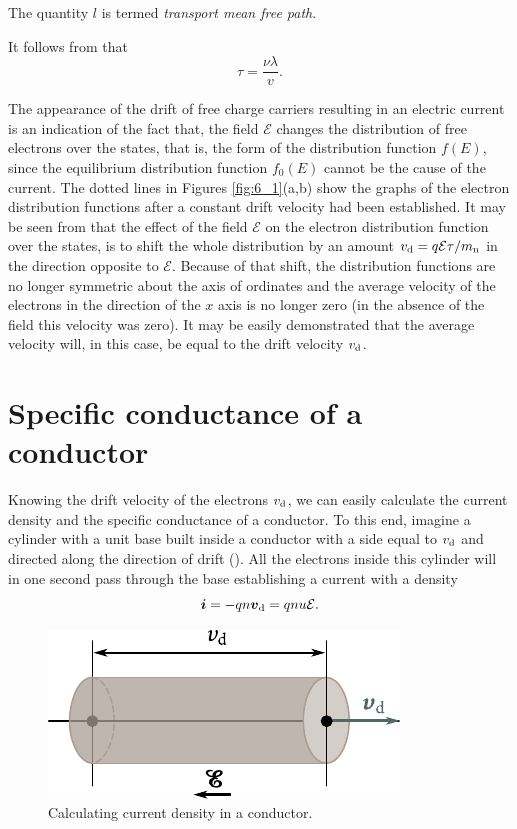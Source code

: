\noindent
The quantity $l$ is termed \textit{transport mean free path}.

It follows from  that
\begin{equation}\label{eq:6_10}
    \tau = \frac{\nu \lambda}{v}.
\end{equation}

\noindent
The appearance of the drift of free charge carriers resulting in an electric current is an indication of the fact that, the field $\mathcal{E}$ changes the distribution of free electrons over the states, that is, the form of the distribution function $f(E)$, since the equilibrium distribution function $f_0(E)$ cannot be the cause of the current. The dotted lines in Figures \ref{fig:6_1}(a,b) show the graphs of the electron distribution functions after a constant drift velocity had been established. It may be seen from  that the effect of the field $\mathcal{E}$ on the electron distribution function over the states, is to shift the whole distribution by an amount $v_{\text{d}}=q\mathcal{E}\tau/m_{\text{n}}$ in the direction opposite to $\mathcal{E}$. Because of that shift, the distribution functions are no longer symmetric about the axis of ordinates and the average velocity of the
electrons in the direction of the $x$ axis is no longer zero (in the absence of the field this velocity was zero). It may be easily demonstrated that the average velocity will, in this case, be equal to the drift velocity $v_{\text{d}}$.

\section{Specific conductance of a conductor}\label{sec:50}

Knowing the drift velocity of the electrons $v_{\text{d}}$, we can easily calculate the current density and the specific conductance of a conductor. To this end, imagine a cylinder with a unit base built inside a conductor with a side equal to $v_{\text{d}}$ and directed along the direction of drift (). All the electrons inside this cylinder will in one second pass through the base establishing a current with a density
\begin{equation}\label{eq:6_11}
    \boldsymbol{i} = -q n \boldsymbol{v}_{\text{d}} = qnu \mathcal{E}.
\end{equation}

\begin{figure}[t]
	\begin{center}
		\includegraphics[scale=1]{figures/ch_06/fig_6_3.pdf}
		\caption[]{Calculating current density in a conductor.}
		\label{fig:6_3}
	\end{center}
	\vspace{-0.7cm}
\end{figure}


